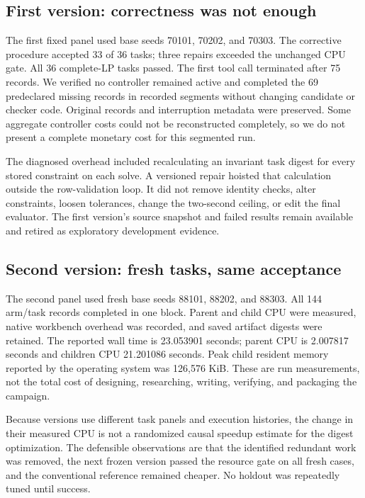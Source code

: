 \subsection{First version: correctness was not
enough}\label{first-version-correctness-was-not-enough}

The first fixed panel used base seeds 70101, 70202, and 70303. The
corrective procedure accepted 33 of 36 tasks; three repairs exceeded the
unchanged CPU gate. All 36 complete-LP tasks passed. The first tool call
terminated after 75 records. We verified no controller remained active
and completed the 69 predeclared missing records in recorded segments
without changing candidate or checker code. Original records and
interruption metadata were preserved. Some aggregate controller costs
could not be reconstructed completely, so we do not present a complete
monetary cost for this segmented run.

The diagnosed overhead included recalculating an invariant task digest
for every stored constraint on each solve. A versioned repair hoisted
that calculation outside the row-validation loop. It did not remove
identity checks, alter constraints, loosen tolerances, change the
two-second ceiling, or edit the final evaluator. The first version's
source snapshot and failed results remain available and retired as
exploratory development evidence.

\subsection{Second version: fresh tasks, same
acceptance}\label{second-version-fresh-tasks-same-acceptance}

The second panel used fresh base seeds 88101, 88202, and 88303. All 144
arm/task records completed in one block. Parent and child CPU were
measured, native workbench overhead was recorded, and saved artifact
digests were retained. The reported wall time is 23.053901 seconds;
parent CPU is 2.007817 seconds and children CPU 21.201086 seconds. Peak
child resident memory reported by the operating system was 126,576 KiB.
These are run measurements, not the total cost of designing,
researching, writing, verifying, and packaging the campaign.

Because versions use different task panels and execution histories, the
change in their measured CPU is not a randomized causal speedup estimate
for the digest optimization. The defensible observations are that the
identified redundant work was removed, the next frozen version passed
the resource gate on all fresh cases, and the conventional reference
remained cheaper. No holdout was repeatedly tuned until success.

